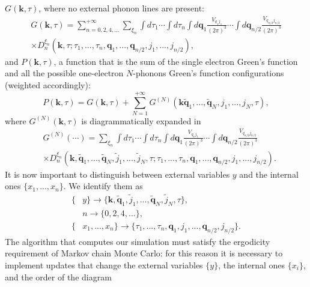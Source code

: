 $G(\mathbf{k},\tau)$, where no external phonon lines are present:
\begin{equation}
\begin{split}
    G(\mathbf{k},\tau)=\sum_{n=0,2,4,...}^{+\infty}\sum_{\xi_n}\int d\tau_1\cdots \int d\tau_n\int d\mathbf{q}_1 \frac{V_{q_1j_1}}{(2\pi)^3}\cdots\int d\mathbf{q}_{n/2}\frac{V_{q_{n/2}j_{n/2}}}{(2\pi)^3} \\
    \times D_n^{\xi_n}(\mathbf{k},\tau;\tau_1,...,\tau_{n},\mathbf{q}_1,...,\mathbf{q}_{n/2},j_1,...,j_{n/2}),
\end{split}
\end{equation}
and $P(\mathbf{k},\tau)$, a function that is the sum of the single electron Green's function and all the possible one-electron $N$-phonons Green's function 
configurations (weighted accordingly):
\begin{equation}
    P(\mathbf{k},\tau)=G(\mathbf{k},\tau)+\sum_{N=1}^{+\infty}G^{(N)}(\mathbf{k}\tilde{\mathbf{q}}_1,...,\tilde{\mathbf{q}}_N, j_1,...,j_N,\tau),
\end{equation}
where $G^{(N)}(\mathbf{k},\tau)$ is diagrammatically expanded in 
\begin{equation}
\begin{split}
   &G^{(N)}(\cdots)=\sum_{\xi_n}\int d\tau_1\cdots \int d\tau_n\int d\mathbf{q}_1\frac{V_{q_1j_1}}{(2\pi)^3}\cdots\int d\mathbf{q}_{n/2}\frac{V_{q_{n/2}j_{n/2}}}{(2\pi)^3}\\
    &\times D_n^{\xi_n}(\mathbf{k},\tilde{\mathbf{q}}_1,...,\tilde{\mathbf{q}}_N,\tilde{j}_1,...,\tilde{j}_N,\tau;\tau_1,...,\tau_n,\mathbf{q}_1,...,\mathbf{q}_{n/2},j_1,...,j_{n/2}).
\end{split}
\end{equation}
It is now important to distinguish between external variables ${y}$ and the internal ones $\{x_1,...,x_n\}$. We identify them as
\begin{equation}
\begin{split}
    \{&y\}\to \{\mathbf{k},\tilde{\mathbf{q}}_1,\tilde{j}_1,...,\tilde{\mathbf{q}}_N,\tilde{j}_N, \tau \},\\
    &n\to \{0,2,4,...\},\\
    \{&x_1,...,x_n\}\to \{\tau_1,...,\tau_n, \mathbf{q}_1, j_1,..., \mathbf{q}_{n/2}, j_{n/2}\}.
\end{split}
\end{equation}
The algorithm that computes our simulation must satisfy the ergodicity requirement of Markov chain Monte Carlo: for this reason it 
is necessary to implement updates that change the external variables $\{y\}$, the internal ones $\{x_i\}$, and the order of the diagram 
